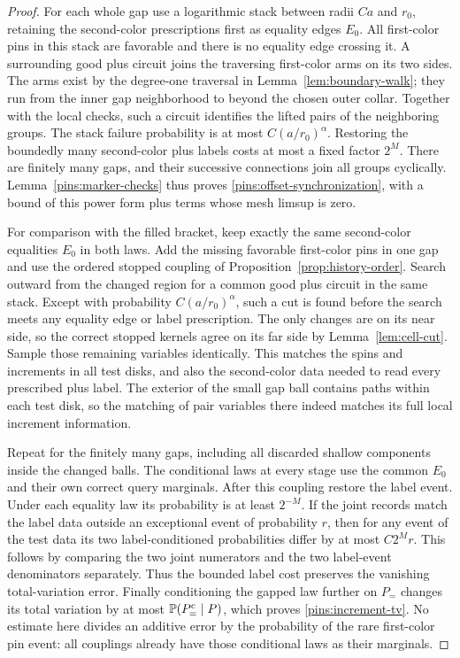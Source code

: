 \begin{proof}
For each whole gap use a logarithmic stack between radii $Ca$ and
$r_0$, retaining the second-color prescriptions first as equality
edges $E_0$.  All first-color pins in this stack are favorable and
there is no equality edge crossing it.  A surrounding good plus circuit
joins the traversing first-color arms on its two sides.  The arms
exist by the degree-one traversal in Lemma~\ref{lem:boundary-walk};
they run from the inner gap neighborhood to beyond the chosen outer
collar.  Together with the local checks, such a circuit identifies
the lifted pairs of the neighboring groups.  The stack failure
probability is at most $C(a/r_0)^\alpha$.  Restoring the boundedly
many second-color plus labels costs at most a fixed factor $2^M$.
There are finitely many gaps, and their successive connections join
all groups cyclically.  Lemma~\ref{pins:marker-checks} thus proves
\eqref{pins:offset-synchronization}, with a bound of this power form
plus terms whose mesh limsup is zero.

For comparison with the filled bracket, keep exactly the same
second-color equalities $E_0$ in both laws.  Add the missing favorable
first-color pins in one gap and use the ordered stopped coupling of
Proposition~\ref{prop:history-order}.  Search outward from the changed
region for a common good plus circuit in the same stack.  Except
with probability $C(a/r_0)^\alpha$, such a cut is found before the
search meets any equality edge or label prescription.  The only
changes are on its near side, so the correct stopped kernels agree
on its far side by Lemma~\ref{lem:cell-cut}.  Sample those remaining
variables identically.  This matches the spins and increments in all
test disks, and also the second-color data needed to read every
prescribed plus label.  The exterior of the small gap ball contains
paths within each test disk, so the matching of pair variables there
indeed matches its full local increment information.

Repeat for the finitely many gaps, including all discarded shallow
components inside the changed balls.  The conditional laws at every
stage use the common $E_0$ and their own correct query marginals.
After this coupling restore the label event.  Under each equality law
its probability is at least $2^{-M}$.  If the joint records match the
label data outside an exceptional event of probability $r$, then for
any event of the test data its two label-conditioned probabilities
differ by at most $C2^M r$.  This follows by comparing the two joint
numerators and the two label-event denominators separately.  Thus the
bounded label cost preserves the vanishing total-variation error.
Finally conditioning the gapped law further on $P_=$ changes its
total variation by at most $\mathbb P(P_=^c\mid P)$, which proves
\eqref{pins:increment-tv}.  No estimate here divides an additive
error by the probability of the rare first-color pin event: all
couplings already have those conditional laws as their marginals.


\end{proof}
